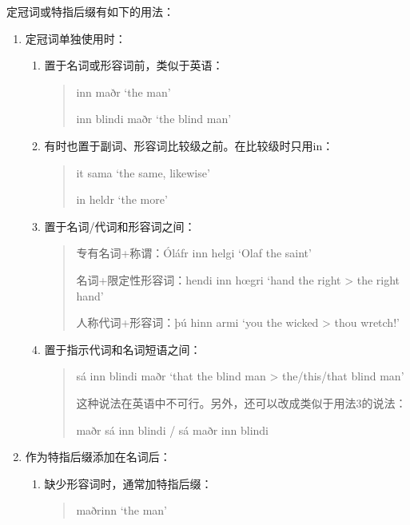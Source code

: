 定冠词或特指后缀有如下的用法：

\begin{enumerate}
  \item 定冠词单独使用时：
        \begin{enumerate}
          \item 置于名词或形容词前，类似于英语：
                \begin{quote}
                  inn maðr `the man'

                  inn blindi maðr `the blind man'
                \end{quote}

          \item 有时也置于副词、形容词比较级之前。在比较级时只用in：
                \begin{quote}
                  it sama `the same, likewise'

                  in heldr `the more'
                \end{quote}

          \item 置于名词/代词和形容词之间：
                \begin{quote}
                  专有名词+称谓：Óláfr inn helgi `Olaf the saint'

                  名词+限定性形容词：hendi inn hœgri `hand the right > the
                  right hand'

                  人称代词+形容词：þú hinn armi `you the wicked > thou
                  wretch!'
                \end{quote}

          \item 置于指示代词和名词短语之间：
                \begin{quote}
                  sá inn blindi maðr `that the blind man > the/this/that
                  blind man'

                  这种说法在英语中不可行。另外，还可以改成类似于用法3的说法：

                  maðr sá inn blindi / sá maðr inn blindi
                \end{quote}

        \end{enumerate}

  \item 作为特指后缀添加在名词后：
        \begin{enumerate}
          \item 缺少形容词时，通常加特指后缀：
                \begin{quote}
                  maðrinn `the man'
                \end{quote}


\end{enumerate}
\end{enumerate}
